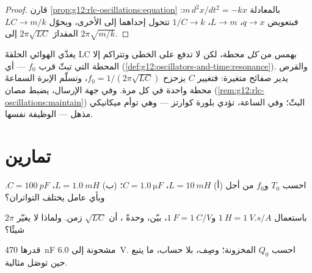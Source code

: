 \begin{proof}
قارن \cref{prop:g12:rlc-oscillations:equation} بالمعادلة
$m\,d^2x/dt^2 = -kx$: فبتعويض $q \to x$، $L \to m$، $1/C \to k$
تتحول إحداهما إلى الأخرى، ويحوّل $LC \to m/k$
المقدارَ $2\pi\sqrt{LC}$ إلى $2\pi\sqrt{m/k}$.
\end{proof}

\begin{example}\label{ex:g12:rlc-oscillations:tuning}
يغذّي الهوائي الحلقةَ LC بهمس من \emph{كل} محطة، لكن
لا تدفع على الخطى وتتراكم إلا المحطة التي تبثّ قرب $f_0$ ---
أي  (\cref{def:g12:oscillators-and-time:resonance}). والقرص
يدير صفائح  متغيرة: فتغيير $C$ يزحزح
$f_0 = 1/(2\pi\sqrt{LC})$، وتسلّم الإبرة السماعةَ محطة
واحدة في كل مرة. وفي جهة الإرسال، يضبط  مصان
(\cref{rem:g12:rlc-oscillations:maintain}) 
البثّ؛ وفي الساعة، تؤدي بلورة كوارتز --- وهي توأم ميكانيكي
مذهل  --- الوظيفة نفسها.
\end{example}

\section{تمارين}

\begin{exercise}[$\star$]\label{exo:g12:rlc-oscillations:1}
احسب $T_0$ و$f_0$ من أجل (أ) $L = \qty{10}{mH}$،
$C = \qty{1.0}{\micro F}$؛ (ب) $L = \qty{1.0}{mH}$،
$C = \qty{100}{pF}$. وبأي عامل يختلف التواتران؟
\end{exercise}

\begin{exercise}[$\star$]\label{exo:g12:rlc-oscillations:2}
باستعمال $\qty{1}{H} = \qty{1}{V.s/A}$ و$\qty{1}{F} = \qty{1}{C/V}$،
بيّن، وحدةً ، أن $\sqrt{LC}$ زمن. ولماذا لا يغيّر $2\pi$
شيئًا؟
\end{exercise}

\begin{exercise}[$\star$]\label{exo:g12:rlc-oscillations:3}
 قدرها \qty{470}{nF} مشحونة إلى \qty{6.0}{V}. احسب $Q_0$
 المخزونة؛ وصِف، بلا حساب، ما يتبع
حين توصَل  مثالية.
\end{exercise}


